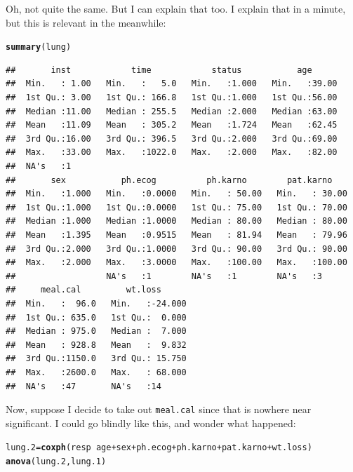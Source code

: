 \documentclass{article}\usepackage[]{graphicx}\usepackage[]{color}
\makeatletter
\newcommand{\hlopt}[1]{\textcolor[rgb]{0,0,0}{#1}}%
\newcommand{\hlstd}[1]{\textcolor[rgb]{0.345,0.345,0.345}{#1}}%
\newcommand{\hlkwb}[1]{\textcolor[rgb]{0.69,0.353,0.396}{#1}}%
\newcommand{\hlkwd}[1]{\textcolor[rgb]{0.737,0.353,0.396}{\textbf{#1}}}%
\newenvironment{kframe}{%
 \def\at@end@of@kframe{}%
 \ifinner\ifhmode%
  \def\at@end@of@kframe{\end{minipage}}%
  \begin{minipage}{\columnwidth}%
 \fi\fi%
 \def\FrameCommand##1{\hskip\@totalleftmargin \hskip-\fboxsep
 \colorbox{shadecolor}{##1}\hskip-\fboxsep
     \hskip-\linewidth \hskip-\@totalleftmargin \hskip\columnwidth}%
 \MakeFramed {\advance\hsize-\width
   \@totalleftmargin\z@ \linewidth\hsize
   \@setminipage}}%
 {\par\unskip\endMakeFramed%
 \at@end@of@kframe}
\newenvironment{knitrout}{}{} %
\makeatother
\begin{document}
Oh, not quite the same. But I can explain that too. I explain that in a minute,
but this is relevant in the meanwhile:

\begin{knitrout}
\color{fgcolor}\begin{kframe}
\begin{alltt}
\hlkwd{summary}\hlstd{(lung)}
\end{alltt}
\begin{verbatim}
##       inst            time            status           age       
##  Min.   : 1.00   Min.   :   5.0   Min.   :1.000   Min.   :39.00  
##  1st Qu.: 3.00   1st Qu.: 166.8   1st Qu.:1.000   1st Qu.:56.00  
##  Median :11.00   Median : 255.5   Median :2.000   Median :63.00  
##  Mean   :11.09   Mean   : 305.2   Mean   :1.724   Mean   :62.45  
##  3rd Qu.:16.00   3rd Qu.: 396.5   3rd Qu.:2.000   3rd Qu.:69.00  
##  Max.   :33.00   Max.   :1022.0   Max.   :2.000   Max.   :82.00  
##  NA's   :1                                                       
##       sex           ph.ecog          ph.karno        pat.karno     
##  Min.   :1.000   Min.   :0.0000   Min.   : 50.00   Min.   : 30.00  
##  1st Qu.:1.000   1st Qu.:0.0000   1st Qu.: 75.00   1st Qu.: 70.00  
##  Median :1.000   Median :1.0000   Median : 80.00   Median : 80.00  
##  Mean   :1.395   Mean   :0.9515   Mean   : 81.94   Mean   : 79.96  
##  3rd Qu.:2.000   3rd Qu.:1.0000   3rd Qu.: 90.00   3rd Qu.: 90.00  
##  Max.   :2.000   Max.   :3.0000   Max.   :100.00   Max.   :100.00  
##                  NA's   :1        NA's   :1        NA's   :3       
##     meal.cal         wt.loss       
##  Min.   :  96.0   Min.   :-24.000  
##  1st Qu.: 635.0   1st Qu.:  0.000  
##  Median : 975.0   Median :  7.000  
##  Mean   : 928.8   Mean   :  9.832  
##  3rd Qu.:1150.0   3rd Qu.: 15.750  
##  Max.   :2600.0   Max.   : 68.000  
##  NA's   :47       NA's   :14
\end{verbatim}
\end{kframe}
\end{knitrout}

Now, suppose I decide to take out \texttt{meal.cal} since that is
nowhere near significant. I could go blindly like this, and wonder
what happened:

\begin{knitrout}
\color{fgcolor}\begin{kframe}
\begin{alltt}
\hlstd{lung.2}\hlkwb{=}\hlkwd{coxph}\hlstd{(resp}\hlopt{~}\hlstd{age}\hlopt{+}\hlstd{sex}\hlopt{+}\hlstd{ph.ecog}\hlopt{+}\hlstd{ph.karno}\hlopt{+}\hlstd{pat.karno}\hlopt{+}\hlstd{wt.loss)}
\hlkwd{anova}\hlstd{(lung.2,lung.1)}
\end{alltt}


{\ttfamily\noindent\bfseries\color{errorcolor}{\#\# Error in anova.coxphlist(c(list(object), dotargs), test = test): models were not all fitted to the same size of dataset}}\end{kframe}
\end{knitrout}
\end{document}

